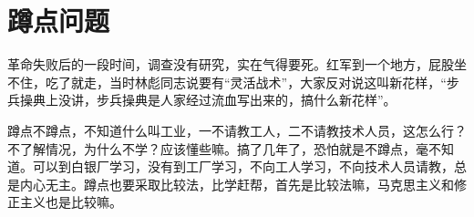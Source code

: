 \section[蹲点问题（一九六四）]{蹲点问题}


革命失败后的一段时间，调查没有研究，实在气得要死。红军到一个地方，屁股坐不住，吃了就走，当时林彪同志说要有“灵活战术”，大家反对说这叫新花样，“步兵操典上没讲，步兵操典是人家经过流血写出来的，搞什么新花样”。

蹲点不蹲点，不知道什么叫工业，一不请教工人，二不请教技术人员，这怎么行？不了解情况，为什么不学？应该懂些嘛。搞了几年了，恐怕就是不蹲点，毫不知道。可以到白银厂学习，没有到工厂学习，不向工人学习，不向技术人员请教，总是内心无主。蹲点也要采取比较法，比学赶帮，首先是比较法嘛，马克思主义和修正主义也是比较嘛。

